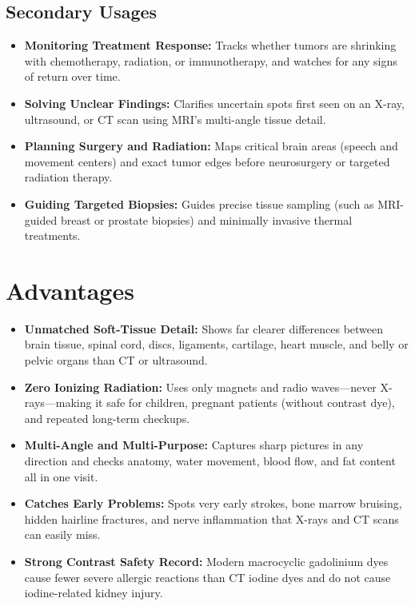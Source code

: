\subsection{Secondary Usages}
\begin{itemize}
\item \textbf{Monitoring Treatment Response:} Tracks whether tumors are shrinking with chemotherapy, radiation, or immunotherapy, and watches for any signs of return over time.
\item \textbf{Solving Unclear Findings:} Clarifies uncertain spots first seen on an X-ray, ultrasound, or CT scan using MRI's multi-angle tissue detail.
\item \textbf{Planning Surgery and Radiation:} Maps critical brain areas (speech and movement centers) and exact tumor edges before neurosurgery or targeted radiation therapy.
\item \textbf{Guiding Targeted Biopsies:} Guides precise tissue sampling (such as MRI-guided breast or prostate biopsies) and minimally invasive thermal treatments.
\end{itemize}

\section{Advantages}
\begin{itemize}
\item \textbf{Unmatched Soft-Tissue Detail:} Shows far clearer differences between brain tissue, spinal cord, discs, ligaments, cartilage, heart muscle, and belly or pelvic organs than CT or ultrasound.
\item \textbf{Zero Ionizing Radiation:} Uses only magnets and radio waves---never X-rays---making it safe for children, pregnant patients (without contrast dye), and repeated long-term checkups.
\item \textbf{Multi-Angle and Multi-Purpose:} Captures sharp pictures in any direction and checks anatomy, water movement, blood flow, and fat content all in one visit.
\item \textbf{Catches Early Problems:} Spots very early strokes, bone marrow bruising, hidden hairline fractures, and nerve inflammation that X-rays and CT scans can easily miss.
\item \textbf{Strong Contrast Safety Record:} Modern macrocyclic gadolinium dyes cause fewer severe allergic reactions than CT iodine dyes and do not cause iodine-related kidney injury.
\end{itemize}

